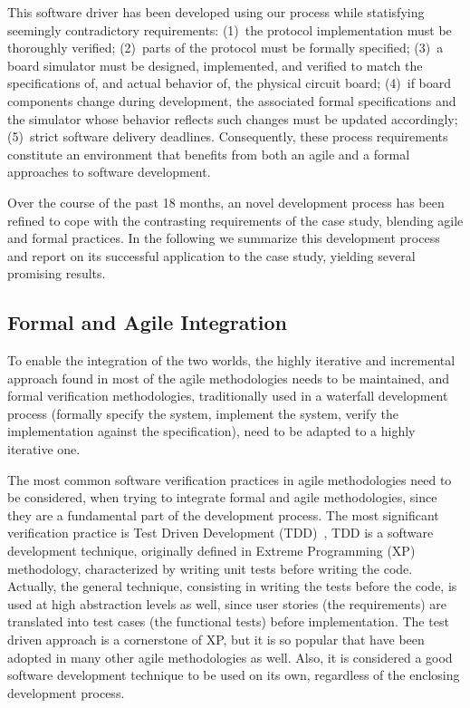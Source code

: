 \documentclass[english]{lni}
\begin{document}
This software driver has been developed using our process while
statisfying seemingly contradictory requirements: (1)~the protocol
implementation must be thoroughly verified; (2)~parts of the protocol
must be formally specified; (3)~a board simulator must be designed,
implemented, and verified to match the specifications of, and actual
behavior of, the physical circuit board; (4)~if board components
change during development, the associated formal specifications and
the simulator whose behavior reflects such changes must be updated
accordingly; (5)~strict software delivery deadlines.  Consequently,
these process requirements constitute an environment that benefits
from both an agile and a formal approaches to software development.

Over the course of the past 18 months, an novel development process
has been refined to cope with the contrasting requirements of the case
study, blending agile and formal practices.  In the following we
summarize this development process and report on its successful
application to the case study, yielding several promising results.

\subsection{Formal and Agile Integration}
\label{subsec:formal_and_agile_integration}

To enable the integration of the two worlds, the highly iterative and incremental approach found in most of the agile methodologies needs to be maintained, and formal verification  methodologies, traditionally used in a waterfall development process (formally specify the system, implement the system, verify the implementation against the specification), need to be adapted to a highly iterative one.

The most common software verification practices in agile methodologies need to be considered, when trying to integrate formal and agile methodologies, since they are a fundamental part of the development process. 
The most significant verification practice is Test Driven Development (TDD)~\cite{Beck2003}, TDD is a software development technique, originally defined in Extreme Programming (XP)~\cite{Beck2004} methodology, characterized by writing unit tests before writing the code.
Actually, the general technique, consisting in writing the tests before the code, is used at high abstraction levels as well, since user stories (the requirements) are translated into test cases (the functional tests) before implementation.
The test driven approach is a cornerstone of XP, but it is so popular that have been adopted in many other agile methodologies as well.
Also, it is considered a good software development technique to be used on its own, regardless of the enclosing development process.
\end{document}
